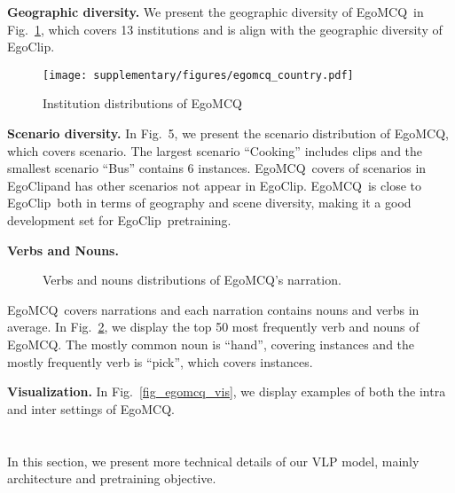 \documentclass{article}
\newcommand{\dataset}{EgoClip}
\newcommand{\eval}{EgoMCQ}
\begin{document}
\noindent\textbf{Geographic diversity.}
We present the geographic diversity of \eval~in Fig.~\ref{fig_egomcq_country}, which covers 13 institutions and is align with the geographic diversity of \dataset.
\begin{figure}[htb]
\vspace{-0.25cm}
    \centering
    \texttt{[image: supplementary/figures/egomcq\_country.pdf]}
    \caption{Institution distributions of \eval}
    \label{fig_egomcq_country}
\vspace{-0.25cm}
\end{figure} 
\noindent\textbf{Scenario diversity.}
In Fig.~5, we present the scenario distribution of \eval, which covers  scenario. 
The largest scenario ``Cooking'' includes  clips and the smallest scenario ``Bus'' contains 6 instances.
\eval~covers  of scenarios in \dataset and has other  scenarios not appear in \dataset.
\eval~is close to \dataset~both in terms of geography and scene diversity, making it a good development set for \dataset~pretraining.

\noindent\textbf{Verbs and Nouns.}
\begin{figure}[htb]
\vspace{-0.25cm}
\centering
{}
\centering
\caption{Verbs and nouns distributions of \eval's narration.}
\label{fig_egomcq_v_n}
\vspace{-0.25cm}
\end{figure} \eval~covers  narrations and each narration contains  nouns and  verbs in average. 
In Fig.~\ref{fig_egomcq_v_n}, we display the top 50 most frequently verb and nouns of \eval. The mostly common noun is ``hand'', covering  instances and the mostly frequently verb is ``pick'', which covers  instances.

\noindent\textbf{Visualization.}
In Fig.~\ref{fig_egomcq_vis}, we display examples of both the intra and inter settings of \eval. \section{\secc}\label{c}
In this section, we present more technical details of our VLP model, mainly architecture and pretraining objective. 
\end{document}
